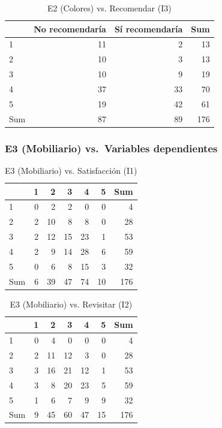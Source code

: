 \documentclass[
  spanish,
]{article}
\begin{document}
\begin{longtable}[t]{lrrr}
\caption{\label{tab:cont-e2-recom}E2 (Colores) vs. Recomendar (I3)}\\
\toprule
 & No recomendaría & Sí recomendaría & Sum\\
\midrule
1 & 11 & 2 & 13\\
2 & 10 & 3 & 13\\
3 & 10 & 9 & 19\\
4 & 37 & 33 & 70\\
5 & 19 & 42 & 61\\
\addlinespace
Sum & 87 & 89 & 176\\
\bottomrule
\end{longtable}

\subsubsection{E3 (Mobiliario) vs.~Variables
dependientes}\label{e3-mobiliario-vs.-variables-dependientes}

\begin{longtable}[t]{lrrrrrr}
\caption{\label{tab:cont-e3-satisf}E3 (Mobiliario) vs. Satisfacción (I1)}\\
\toprule
 & 1 & 2 & 3 & 4 & 5 & Sum\\
\midrule
1 & 0 & 2 & 2 & 0 & 0 & 4\\
2 & 2 & 10 & 8 & 8 & 0 & 28\\
3 & 2 & 12 & 15 & 23 & 1 & 53\\
4 & 2 & 9 & 14 & 28 & 6 & 59\\
5 & 0 & 6 & 8 & 15 & 3 & 32\\
\addlinespace
Sum & 6 & 39 & 47 & 74 & 10 & 176\\
\bottomrule
\end{longtable}

\begin{longtable}[t]{lrrrrrr}
\caption{\label{tab:cont-e3-revis}E3 (Mobiliario) vs. Revisitar (I2)}\\
\toprule
 & 1 & 2 & 3 & 4 & 5 & Sum\\
\midrule
1 & 0 & 4 & 0 & 0 & 0 & 4\\
2 & 2 & 11 & 12 & 3 & 0 & 28\\
3 & 3 & 16 & 21 & 12 & 1 & 53\\
4 & 3 & 8 & 20 & 23 & 5 & 59\\
5 & 1 & 6 & 7 & 9 & 9 & 32\\
\addlinespace
Sum & 9 & 45 & 60 & 47 & 15 & 176\\
\bottomrule
\end{longtable}
\end{document}
